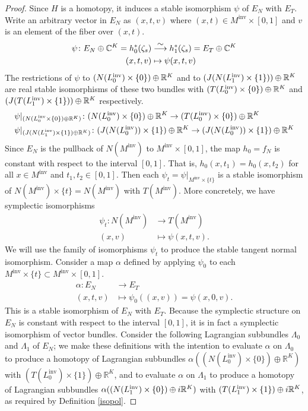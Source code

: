 \documentclass[11pt]{amsart}
\theoremstyle{definition}
\theoremstyle{remark}
\def\C{\mathbb{C}}
\def\R{\mathbb{R}}
\def\co{\colon }
\newcommand{\M}{M^{\operatorname{inv}}}
\newcommand{\Lo}{L_0^{\operatorname{inv}}}
\newcommand{\Li}{L_1^{\operatorname{inv}}}
\numberwithin{equation}{section}
\begin{document}
\begin{proof}
Since $H$ is a homotopy, it induces a stable isomorphism $\psi$ of $E_N$ with $E_T$. Write an arbitrary vector in $E_N$ as $(x,t,v)$ where $(x,t) \in \M \times [0,1]$ and $v$ is an element of the fiber over $(x,t)$.
%
\begin{align*}
\psi \co E_N \oplus \mathbb C^K = h_0^*(\zeta_s)
&\stackrel{\hbox{\footnotesize$\sim$}}{\longrightarrow} h_1^*(\zeta_s) = E_T \oplus \C^K\\
(x,t,v) & \mapsto \psi(x,t,v)
\end{align*}
The restrictions of $\psi$ to $(N(\smash{\Lo}) \times \{0\}) \oplus \mathbb  R^K$ and to $(J(N(\smash{\Li}) \times\{1\})) \oplus \mathbb R^K$ are real stable isomorphisms of these two bundles with $(T(\smash{\Lo}) \times \{0\}) \oplus \mathbb  R^K$ and  $(J(T(\smash{\Li}) \times\{1\})) \oplus \mathbb R^K$ respectively.
%
\begin{align*}
&\psi|_{(N(\smash{\Lo} \times \{0\}) \oplus \mathbb R^K)} \co (N(\smash{\Lo}) \times \{0\}) \oplus \mathbb R^K \rightarrow (T(\smash{\Lo}) \times \{0\}) \oplus \mathbb R^K \\
&\psi|_{(J(N(\smash{\Li}) \times \{1\}) \oplus \mathbb R^K)} \co (J(N(\smash{\Lo})) \times \{1\}) \oplus \mathbb R^K \rightarrow (J(N(\smash{\Lo})) \times \{1\}) \oplus \mathbb R^K
\end{align*}
%
Since $E_N$ is the pullback of $N(\M)$ to $\M \times [0,1]$, the map $h_0 = f_N$ is constant with respect to the interval $[0,1]$. That is, $h_0(x,t_1) = h_0(x,t_2)$ for all $x \in \M$ and $t_1,t_2 \in [0,1]$. Then each $\psi_t = \psi|_{\M \times \{t\}}$ is a stable isomorphism of $N(\M) \times \{t\} = N(\M)$ with $T(\M)$.  More concretely, we have symplectic isomorphisms
%
\begin{align*}
\psi_t \co N(\M) &\rightarrow T(\M)\\
(x,v) &\mapsto \psi(x,t,v).
\end{align*}
We will use the family of isomorphisms $\psi_t$ to produce the stable tangent normal isomorphism. Consider a map $\alpha$ defined by applying $\psi_0$ to each $\M \times \{t\} \subset \M \times [0,1]$.
%
%
\begin{align*}
\alpha \co E_N &\rightarrow E_T\\
(x,t,v) &\mapsto \psi_0((x,v)) = \psi(x,0,v).
\end{align*}
This is a stable isomorphism of $E_N$ with $E_T$. Because the symplectic structure on $E_N$ is constant with respect to the interval $[0,1]$, it is in fact a symplectic isomorphism of vector bundles. Consider the following Lagrangian subbundles $\Lambda_0$ and $\Lambda_1$ of $E_N$; we make these definitions with the intention to evaluate $\alpha$ on $\Lambda_0$ to produce a homotopy of Lagrangian subbundles $\alpha((N(\Lo)\times\{0\})\oplus \R^K)$ with $(T(\Lo)\times\{1\})\oplus \R^K$, and to evaluate $\alpha$ on $\Lambda_1$ to produce a homotopy of Lagrangian subbundles $\alpha((N(\smash{\Li}) \times \{0\}) \oplus i\mathbb R^K)$ with $(T(\smash{\Li}) \times \{1\}) \oplus i\mathbb R^K$, as required by Definition \ref{isopol}.

\end{proof}
\end{document}
